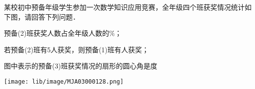 某校初中预备年级学生参加一次数学知识应用竞赛，全年级四个班获奖情况统计如下图，请回答下列问题．

\begin{subquestions}

    \subquestion 预备(2)班获奖人数占全年级人数的\key{\hspace{1cm}}$\%$；

    \subquestion 若预备(2)班有5人获奖，则预备(1)班有\key{\hspace{1cm}}人获奖；

    \subquestion 图中表示的预备(3)班获奖情况的扇形的圆心角是\key{\hspace{1cm}}度

\end{subquestions}



\begin{center}

    \texttt{[image: lib/image/MJA03000128.png]}

\end{center}



